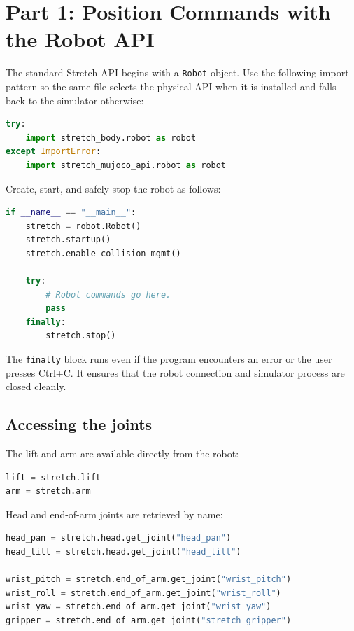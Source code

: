 \documentclass[11pt,a4paper]{article}
\begin{document}
\section{Part 1: Position Commands with the Robot API}

The standard Stretch API begins with a \texttt{Robot} object. Use the following
import pattern so the same file selects the physical API when it is installed and
falls back to the simulator otherwise:

\begin{lstlisting}[language=Python]
try:
    import stretch_body.robot as robot
except ImportError:
    import stretch_mujoco_api.robot as robot
\end{lstlisting}

Create, start, and safely stop the robot as follows:

\begin{lstlisting}[language=Python]
if __name__ == "__main__":
    stretch = robot.Robot()
    stretch.startup()
    stretch.enable_collision_mgmt()

    try:
        # Robot commands go here.
        pass
    finally:
        stretch.stop()
\end{lstlisting}

The \texttt{finally} block runs even if the program encounters an error or the
user presses Ctrl+C. It ensures that the robot connection and simulator process
are closed cleanly.

\subsection*{Accessing the joints}

The lift and arm are available directly from the robot:

\begin{lstlisting}[language=Python]
lift = stretch.lift
arm = stretch.arm
\end{lstlisting}

Head and end-of-arm joints are retrieved by name:

\begin{lstlisting}[language=Python]
head_pan = stretch.head.get_joint("head_pan")
head_tilt = stretch.head.get_joint("head_tilt")

wrist_pitch = stretch.end_of_arm.get_joint("wrist_pitch")
wrist_roll = stretch.end_of_arm.get_joint("wrist_roll")
wrist_yaw = stretch.end_of_arm.get_joint("wrist_yaw")
gripper = stretch.end_of_arm.get_joint("stretch_gripper")
\end{lstlisting}
\end{document}

